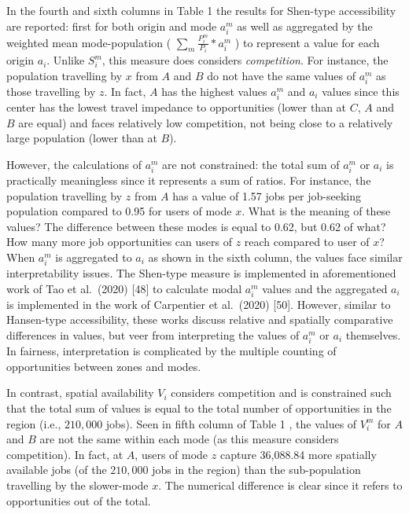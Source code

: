\documentclass[10pt,letterpaper]{article}
\begin{document}
In the fourth and sixth columns in Table 1 the results for Shen-type
accessibility are reported: first for both origin and mode \(a_i^m\) as
well as aggregated by the weighted mean mode-population (
\(\sum_m \frac{P_i^m}{P_i}*a_i^m\) ) to represent a value for each
origin \(a_i\). Unlike \(S_i^m\), this measure does considers
\emph{competition}. For instance, the population travelling by \(x\)
from \(A\) and \(B\) do not have the same values of \(a_i^m\) as those
travelling by \(z\). In fact, \(A\) has the highest values \(a_i^m\) and
\(a_i\) values since this center has the lowest travel impedance to
opportunities (lower than at \(C\), \(A\) and \(B\) are equal) and faces
relatively low competition, not being close to a relatively large
population (lower than at \(B\)).

However, the calculations of \(a_i^m\) are not constrained: the total
sum of \(a_i^m\) or \(a_i\) is practically meaningless since it
represents a sum of ratios. For instance, the population travelling by
\(z\) from \(A\) has a value of 1.57 jobs per job-seeking population
compared to 0.95 for users of mode \(x\). What is the meaning of these
values? The difference between these modes is equal to 0.62, but 0.62 of
what? How many more job opportunities can users of \(z\) reach compared
to user of \(x\)? When \(a_i^m\) is aggregated to \(a_i\) as shown in
the sixth column, the values face similar interpretability issues. The
Shen-type measure is implemented in aforementioned work of Tao et
al.~(2020) {[}48{]} to calculate modal \(a_i^m\) values and the
aggregated \(a_i\) is implemented in the work of Carpentier et
al.~(2020) {[}50{]}. However, similar to Hansen-type accessibility,
these works discuss relative and spatially comparative differences in
values, but veer from interpreting the values of \(a_i^m\) or \(a_i\)
themselves. In fairness, interpretation is complicated by the multiple
counting of opportunities between zones and modes.

In contrast, spatial availability \(V_i\) considers competition and is
constrained such that the total sum of values is equal to the total
number of opportunities in the region (i.e., \(210,000\) jobs). Seen in
fifth column of Table 1 , the values of \(V_i^m\) for \(A\) and \(B\)
are not the same within each mode (as this measure considers
competition). In fact, at \(A\), users of mode \(z\) capture 36,088.84
more spatially available jobs (of the \(210,000\) jobs in the region)
than the sub-population travelling by the slower-mode \(x\). The
numerical difference is clear since it refers to opportunities out of
the total.
\end{document}
